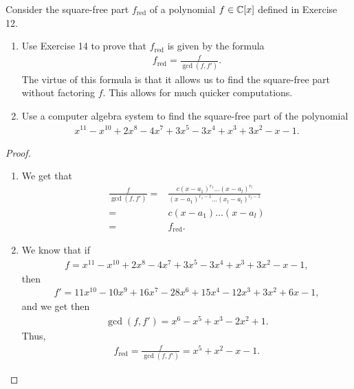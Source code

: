\begin{exercise}{15}
Consider the square-free part $f_{\text{red}}$ of a polynomial $f\in\mathbb{C}[x]$ defined in Exercise 12.
\begin{enumerate}
    \item Use Exercise 14 to prove that $f_{\text{red}}$ is given by the formula
    \begin{align*}
        f_{\text{red}} =\frac{f}{\gcd(f,f')}.
    \end{align*}
    The virtue of this formula is that it allows us to find the square-free part without factoring $f$. 
    This allows for much quicker computations.
    \item Use a computer algebra system to find the square-free part of the polynomial 
    \begin{align*}
        x^{11}-x^{10}+2x^8-4x^7+3x^5-3x^4+x^3+3x^2-x-1.
    \end{align*}
\end{enumerate}
\end{exercise}
\begin{proof}
\begin{enumerate}
    \item We get that
    \begin{align*}
        \frac{f}{\gcd(f,f')}
        =& \frac{c(x-a_1)^{r_1} \dots (x-a_l)^{r_l}}{(x-a_1)^{r_1 - 1} \dots (x_l - a_l)^{r_l - 1}}\\
        =& c(x -a_1) \dots (x - a_l)\\
        =& f_{\text{red}}.
    \end{align*}
    \item We know that if
    \begin{align*}
        f = x^{11}-x^{10}+2x^8-4x^7+3x^5-3x^4+x^3+3x^2-x-1,
    \end{align*}
    then
    \begin{align*}
        f' = 11x^{10} - 10x^9 + 16x^7 - 28x^6 + 15x^4 - 12x^3 + 3x^2 + 6x - 1,
    \end{align*}
    and we get then
    \begin{align*}
        \gcd(f,f') = x^6 - x^5 + x^3 - 2x^2 + 1.
    \end{align*}
    Thus,
    \begin{align*}
        f_{\text{red}} = \frac{f}{\gcd(f,f')} = x^5 + x^2 - x - 1.
    \end{align*}
\end{enumerate}
\end{proof}

